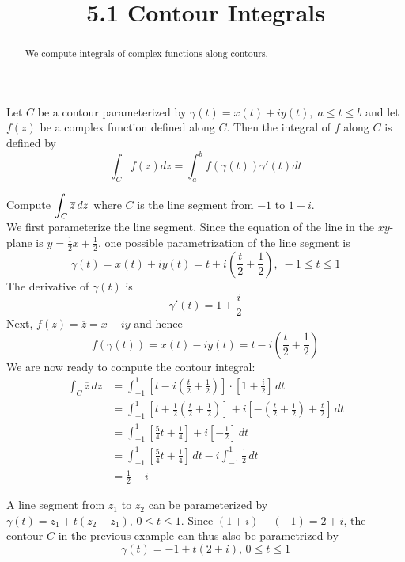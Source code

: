 \documentclass[handout]{ximera}
\title{5.1 Contour Integrals}
\begin{document}
\begin{abstract}
We compute integrals of complex functions along contours.
\end{abstract}

\maketitle


Let $C$ be a contour parameterized by $\gamma(t) = x(t) + iy(t), \; a\leq t \leq b$ and let $f(z)$ be a complex function defined along $C$.
Then the integral of $f$ along $C$ is defined by
\[
\int_C f(z) dz = \int_a^b f(\gamma(t)) \gamma'(t) dt
\]

\begin{example}[example 1]
Compute $\displaystyle \int_C \overline{z} \, dz$ where $C$ is the line segment from $-1$ to $1+i$.\\
We first parameterize the line segment. Since the equation of the line in the $xy$-plane is $y = \frac12x + \frac12$,
one possible parametrization of the line segment is
\[
\gamma(t) = x(t) + iy(t) = t + i\left(\frac{t}{2} + \frac12\right), \; -1 \leq t \leq 1
\]
The derivative of $\gamma(t)$ is 
\[
\gamma'(t) = 1 + \frac{i}{2}
\]
Next, $f(z) = \overline{z} = x-iy$ and hence
\[
f(\gamma(t)) = x(t) - iy(t) = t - i\left(\frac{t}{2} + \frac12\right)
\]
We are now ready to compute the contour integral:
\begin{align*}
\int_C \overline{z} \, dz &= \int_{-1}^1 \left[t - i\left(\frac{t}{2} + \frac12\right)\right]\cdot \left[1 + \frac{i}{2}\right] \, dt\\[6pt]
&= \int_{-1}^1 \left[t + \frac12\left(\frac{t}{2} + \frac12\right)\right] + i\left[-\left(\frac{t}{2} +\frac12\right) + \frac{t}{2}\right] \, dt\\[6pt]
&= \int_{-1}^1 \left[\frac54 t + \frac14\right]+i\left[-\frac12\right] \, dt\\[6pt]
&=\int_{-1}^1 \left[\frac54 t + \frac14\right] \, dt - i\int_{-1}^1  \frac12 \, dt\\[6pt]
                         &= \frac12 - i
\end{align*}
\end{example}

\begin{remark}
A line segment from $z_1$ to $z_2$ can be parameterized by $\gamma(t) = z_1 + t(z_2 - z_1), \, 0\leq t \leq 1$.
Since $(1+i) - (-1) = 2 + i$, the contour $C$ in the previous example can thus also be parametrized by
\[
\gamma(t) = -1 + t(2+i), \, 0 \leq t \leq 1
\]
\end{remark}
\end{document}
